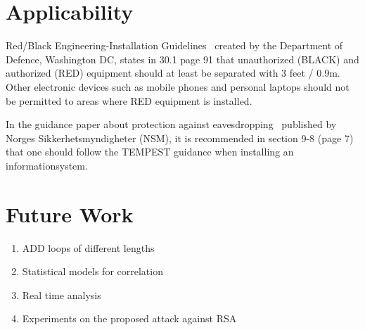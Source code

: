 \section{Applicability}\label{chp6:sec:applicability}

Red/Black Engineering-Installation Guidelines~\cite{MIL_HDBK_232} created by the Department of Defence, Washington DC, states in 30.1 page 91 that unauthorized (BLACK) and authorized (RED) equipment should at least be separated with 3 feet / 0.9m. 
Other electronic devices such as mobile phones and personal laptops should not be permitted to areas where RED equipment is installed. 


In the guidance paper about protection against eavesdropping~\cite{NSM_avlytting} published by Norges Sikkerhetsmyndigheter (NSM), it is recommended in section 9-8 (page 7) that one should follow the TEMPEST guidance when installing an informationsystem.

\section{Future Work}\label{chp6:sec:future_work}
\begin{enumerate}
	\item ADD loops of different lengths
	\item Statistical models for correlation
	\item Real time analysis
	\item Experiments on the proposed attack against RSA
\end{enumerate}